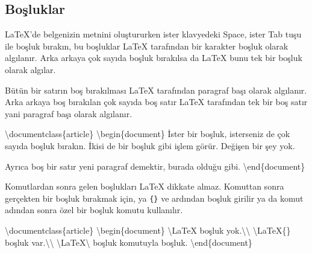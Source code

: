 \documentclass[
  letterpaper,
  DIV=11,
  numbers=noendperiod]{scrreprt}
\newenvironment{Shaded}{\begin{snugshade}}{\end{snugshade}}
\newcommand{\BuiltInTok}[1]{\textcolor[rgb]{0.00,0.23,0.31}{#1}}
\newcommand{\ExtensionTok}[1]{\textcolor[rgb]{0.00,0.23,0.31}{#1}}
\newcommand{\FunctionTok}[1]{\textcolor[rgb]{0.28,0.35,0.67}{#1}}
\newcommand{\KeywordTok}[1]{\textcolor[rgb]{0.00,0.23,0.31}{#1}}
\newcommand{\NormalTok}[1]{\textcolor[rgb]{0.00,0.23,0.31}{#1}}
\begin{document}
\hypertarget{boux15fluklar}{%
\subsection{Boşluklar}\label{boux15fluklar}}

{\LaTeX}'de belgenizin metnini oluştururken ister klavyedeki Space,
ister Tab tuşu ile boşluk bırakın, bu boşluklar {\LaTeX} tarafından bir
karakter boşluk olarak algılanır. Arka arkaya çok sayıda boşluk
bırakılsa da {\LaTeX} bunu tek bir boşluk olarak algılar.

Bütün bir satırın boş bırakılması {\LaTeX} tarafından paragraf başı
olarak algılanır. Arka arkaya boş bırakılan çok sayıda boş satır
{\LaTeX} tarafından tek bir boş satır yani paragraf başı olarak
algılanır.

\begin{Shaded}
\begin{Highlighting}[]
\BuiltInTok{\textbackslash{}documentclass}\NormalTok{\{}\ExtensionTok{article}\NormalTok{\}}
 \KeywordTok{\textbackslash{}begin}\NormalTok{\{}\ExtensionTok{document}\NormalTok{\}}
\NormalTok{    İster bir boşluk, isterseniz de çok         sayıda boşluk bırakın.}
\NormalTok{    İkisi de bir boşluk gibi işlem görür. Değişen bir şey yok.}

\NormalTok{    Ayrıca boş bir satır yeni paragraf demektir, burada olduğu gibi.}
 \KeywordTok{\textbackslash{}end}\NormalTok{\{}\ExtensionTok{document}\NormalTok{\}}
\end{Highlighting}
\end{Shaded}

Komutlardan sonra gelen boşlukları {\LaTeX} dikkate almaz. Komuttan
sonra gerçekten bir boşluk bırakmak için, ya \texttt{\{\}} ve ardından
boşluk girilir ya da komut adından sonra özel bir boşluk komutu
kullanılır.

\begin{Shaded}
\begin{Highlighting}[]
\BuiltInTok{\textbackslash{}documentclass}\NormalTok{\{}\ExtensionTok{article}\NormalTok{\}}
 \KeywordTok{\textbackslash{}begin}\NormalTok{\{}\ExtensionTok{document}\NormalTok{\}}
    \FunctionTok{\textbackslash{}LaTeX}\NormalTok{  boşluk yok.}\FunctionTok{\textbackslash{}\textbackslash{}}
    \FunctionTok{\textbackslash{}LaTeX}\NormalTok{\{\} boşluk var.}\FunctionTok{\textbackslash{}\textbackslash{}}
    \FunctionTok{\textbackslash{}LaTeX\textbackslash{} }\NormalTok{boşluk komutuyla  boşluk.}
 \KeywordTok{\textbackslash{}end}\NormalTok{\{}\ExtensionTok{document}\NormalTok{\}}
\end{Highlighting}
\end{Shaded}
\end{document}
